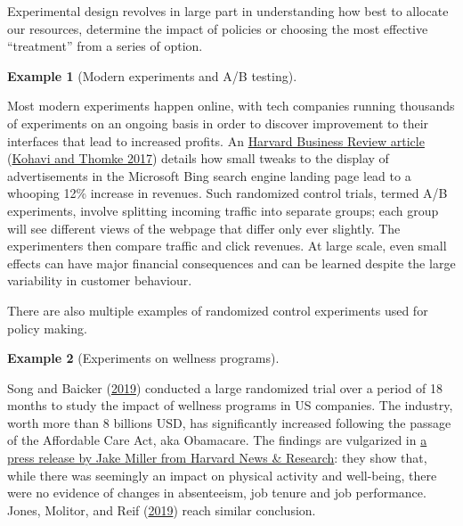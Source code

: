 \documentclass[
  11pt,
  letterpaper,
]{scrbook}
\theoremstyle{definition}
\newtheorem{example}{Example}[chapter]
\theoremstyle{remark}
\begin{document}
Experimental design revolves in large part in understanding how best to
allocate our resources, determine the impact of policies or choosing the
most effective ``treatment'' from a series of option.

\begin{example}[Modern experiments and A/B
testing]\protect\hypertarget{exm-experimentalexample1}{}\label{exm-experimentalexample1}

Most modern experiments happen online, with tech companies running
thousands of experiments on an ongoing basis in order to discover
improvement to their interfaces that lead to increased profits. An
\href{https://hbr.org/2017/09/the-surprising-power-of-online-experiments}{Harvard
Business Review article} (\protect\hyperlink{ref-HBR2017}{Kohavi and
Thomke 2017}) details how small tweaks to the display of advertisements
in the Microsoft Bing search engine landing page lead to a whooping 12\%
increase in revenues. Such randomized control trials, termed A/B
experiments, involve splitting incoming traffic into separate groups;
each group will see different views of the webpage that differ only ever
slightly. The experimenters then compare traffic and click revenues. At
large scale, even small effects can have major financial consequences
and can be learned despite the large variability in customer behaviour.

\end{example}

There are also multiple examples of randomized control experiments used
for policy making.

\begin{example}[Experiments on wellness
programs]\protect\hypertarget{exm-experimentvsobservations}{}\label{exm-experimentvsobservations}

Song and Baicker (\protect\hyperlink{ref-Song.Baicker:2019}{2019})
conducted a large randomized trial over a period of 18 months to study
the impact of wellness programs in US companies. The industry, worth
more than 8 billions USD, has significantly increased following the
passage of the Affordable Care Act, aka Obamacare. The findings are
vulgarized in
\href{https://hms.harvard.edu/news/do-wellness-programs-work}{a press
release by Jake Miller from Harvard News \& Research}: they show that,
while there was seemingly an impact on physical activity and well-being,
there were no evidence of changes in absenteeism, job tenure and job
performance. Jones, Molitor, and Reif
(\protect\hyperlink{ref-Damon.Molitor.Reif:2019}{2019}) reach similar
conclusion.

\end{example}
\end{document}

